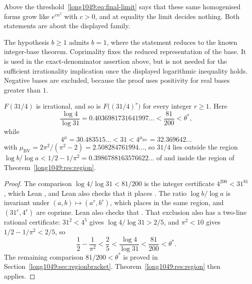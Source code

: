 \noindent Above the threshold~\eqref{long1049:eq:final-limit} says that these same
homogenised forms grow like $e^{cn^{2}}$ with $c>0$, and at equality the limit
decides nothing.  Both statements are about the displayed family.

\noindent The hypothesis $b\ge1$ admits $b=1$, where the statement reduces to
the known integer-base theorem. Coprimality fixes the reduced
representation of the base. It is used in the exact-denominator
assertion above, but is not needed for the sufficient irrationality
implication once the displayed logarithmic inequality holds.
Negative bases are excluded,
because the proof uses positivity for real bases greater than $1$.

\begin{sloppypar}
\begin{theorem}\label{long1049:res:31over4}
$F(31/4)$ is irrational, and so is $F\bigl((31/4)^{r}\bigr)$ for every integer
$r\ge1$.  Here
\[
 \frac{\log4}{\log31}=0.4036981731641997\ldots<\frac{81}{200}<\theta^{*},
\]
while
\[
 4^{\mu}=30.483515\ldots<31<4^{\mu_{\mathrm{BV}}}=32.369642\ldots
\]
with
$\mu_{\mathrm{BV}}=2\pi^{2}/(\pi^{2}-2)=2.508284761994\ldots$, so $31/4$ lies
outside the region $\log b/\log a<1/2-1/\pi^{2}=0.3986788163576622\ldots$ of
\cite[Thm.~2, p.~177]{bv1994} and inside the region of
Theorem~\ref{long1049:res:region}.
\end{theorem}
\end{sloppypar}

\begin{proof}
The comparison $\log4/\log31<81/200$ is the integer certificate
$4^{200}<31^{81}$, which Lean
,
and Lean also checks that it places
.
The ratio $\log b/\log a$ is invariant under $(a,b)\mapsto(a^{r},b^{r})$,
which places
 in the same region, and $(31^{r},4^{r})$ are coprime.
Lean also checks that
.
That exclusion also has a two-line rational certificate: $31^{2}<4^{5}$ gives
$\log4/\log31>2/5$, and $\pi^{2}<10$ gives $1/2-1/\pi^{2}<2/5$, so
\[
 \frac12-\frac1{\pi^{2}}<\frac25<\frac{\log4}{\log31}<\frac{81}{200}<\theta^{*}.
\]
The remaining comparison $81/200<\theta^{*}$ is proved in
Section~\ref{long1049:sec:regionbracket}.  Theorem~\ref{long1049:res:region} then applies.
\end{proof}

